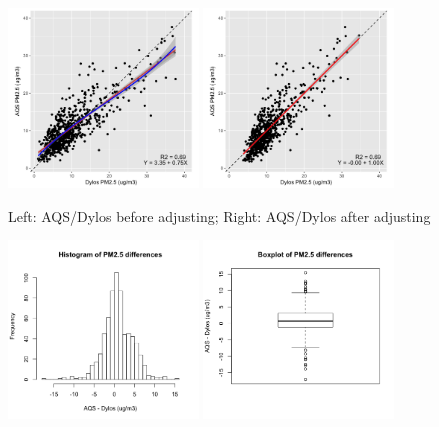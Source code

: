 \documentclass{article}
\begin{document}
\begin{itemize}
{\begin{figure}[H]
            \caption{\citet{carvlin2017development}}
            \label{fig:dylos}
        \end{figure}
        \begin{figure}[H]
            \centering
            \includegraphics[width=0.45\textwidth]{img/aqs_dylos/scatter_reg.jpg} \qquad
            \includegraphics[width=0.45\textwidth]{img/aqs_dylos/scatter_adj.jpg}
            \caption{Left: AQS/Dylos before adjusting; Right: AQS/Dylos after adjusting}
            \label{fig:scatters}
        \end{figure}
        \begin{figure}[H]
            \centering
            \includegraphics[width=0.45\textwidth]{img/aqs_dylos/hist.png} \qquad
            \includegraphics[width=0.45\textwidth]{img/aqs_dylos/boxplot.png}

\end{figure}}
\end{itemize}
\end{document}
